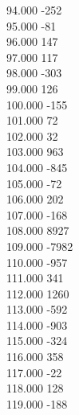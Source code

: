 { 94.000	-252 \\
 95.000	-81 \\
 96.000	147 \\
 97.000	117 \\
 98.000	-303 \\
 99.000	126 \\
 100.000	-155 \\
 101.000	72 \\
 102.000	32 \\
 103.000	963 \\
 104.000	-845 \\
 105.000	-72 \\
 106.000	202 \\
 107.000	-168 \\
 108.000	8927 \\
 109.000	-7982 \\
 110.000	-957 \\
 111.000	341 \\
 112.000	1260 \\
 113.000	-592 \\
 114.000	-903 \\
 115.000	-324 \\
 116.000	358 \\
 117.000	-22 \\
 118.000	128 \\
 119.000	-188 \\
}
